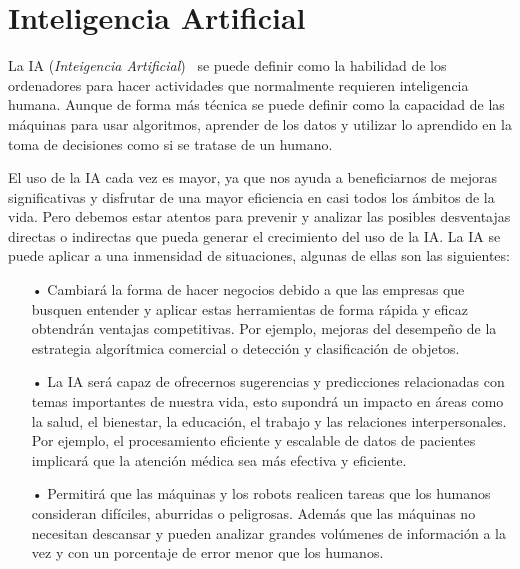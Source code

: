 \documentclass[a4paper, 12pt]{book}
\begin{document}
\section{Inteligencia Artificial} 
\label{sec:InteligenciaArtificial}

La IA (\emph{Inteigencia Artificial})~\cite{rouhiainen2018inteligencia} se puede definir como la habilidad de los ordenadores para hacer actividades que normalmente requieren inteligencia humana. 
Aunque de forma más técnica se puede definir como la capacidad de las máquinas para usar algoritmos, aprender de los datos y utilizar lo aprendido en la toma de decisiones como si se tratase de un humano.

El uso de la IA cada vez es mayor, ya que nos ayuda a beneficiarnos de mejoras significativas y disfrutar de una mayor eficiencia en casi todos los ámbitos de la vida. 
Pero debemos estar atentos para prevenir y analizar las posibles desventajas directas o indirectas que pueda generar el crecimiento del uso de la IA. 
La IA se puede aplicar a una inmensidad de situaciones, algunas de ellas son las siguientes:

\begin{itemize}

    \item[•] Cambiará la forma de hacer negocios debido a que las empresas que busquen entender y aplicar estas herramientas de forma rápida y eficaz obtendrán ventajas competitivas. 
    Por ejemplo, mejoras del desempeño de la estrategia algorítmica comercial o detección y clasificación de objetos.
    
	\item[•] La IA será capaz de ofrecernos sugerencias y predicciones relacionadas con temas importantes de nuestra vida, esto supondrá un impacto en áreas como la salud, el bienestar, la educación, el trabajo y las relaciones interpersonales. 
	Por ejemplo, el procesamiento eficiente y escalable de datos de pacientes implicará que la atención médica sea
más efectiva y eficiente. 

	\item[•] Permitirá que las máquinas y los robots realicen tareas que los humanos consideran difíciles, aburridas o peligrosas. 
	Además que las máquinas no necesitan descansar y pueden analizar grandes volúmenes de información a la vez y con un porcentaje de error menor que los humanos.
	
\end{itemize}
\end{document}
